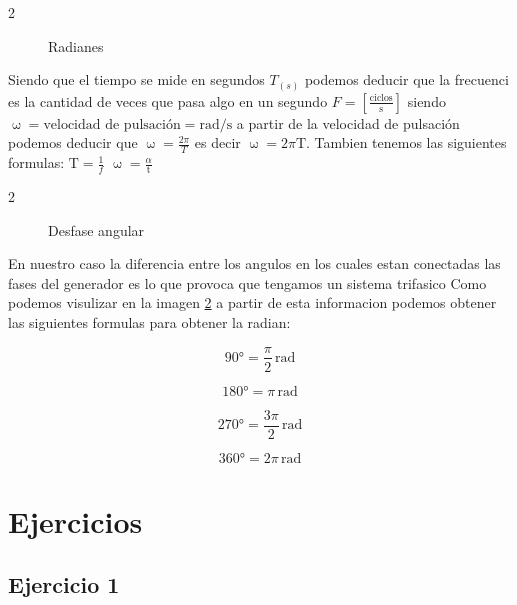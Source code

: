 \documentclass[spanish,openany]{report}
\begin{document}
\begin{paracol}{2}
\begin{figure}[ht]
	\centering
	\caption{Radianes}
	\label{fig:radians}
\end{figure}
\switchcolumn
Siendo que el tiempo se mide en segundos \(T_{(s)} \)
podemos deducir que la frecuenci es la cantidad de veces que pasa algo en un segundo \(F = [\frac{\text{ciclos}}{\text{s}}] \) siendo \(\upomega = \text{velocidad de pulsación} = \si{\radian\per\second}\)
a partir de la velocidad de pulsación podemos deducir que \(\upomega = \frac{2\pi}{T} \) es decir
\(\upomega = 2\pi\text{T}\). Tambien tenemos las siguientes formulas:\hfill
\(\text{T} = \frac{1}{f}\) \hspace{0.5cm} \(\upomega = \frac{\alpha}{\text{t}}\)\hspace{2em}
\end{paracol}
\begin{paracol}{2}
	\switchcolumn
\begin{figure}[ht]
	\centering
	\caption{Desfase angular}
	\label{fig:desfase_angular}
\end{figure}
\switchcolumn
En nuestro caso la diferencia entre los angulos en los cuales estan conectadas las fases del generador es lo que provoca que tengamos un sistema trifasico Como podemos visulizar en la imagen \ref{fig:desfase_angular}
a partir de esta informacion podemos obtener las siguientes formulas para obtener la radian:

\[\ang{90} = \frac{\pi}{2}\, \si{\radian}\]

\[\ang{180} = \pi\, \si{\radian}\]

\[\ang{270} = \frac{3\pi}{2}\, \si{\radian}\]

\[\ang{360} = 2\pi\, \si{\radian}\]

\end{paracol}

\section*{Ejercicios}

	\subsection*{Ejercicio 1}
\end{document}
